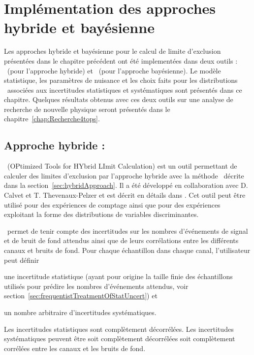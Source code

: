 \chapter{Implémentation des approches hybride et bayésienne}
\label{chap:OTHandTIFOSI}

Les approches hybride et bay\'esienne pour le calcul de limite d'exclusion pr\'esent\'ees dans le chapitre pr\'ec\'edent ont \'et\'e implement\'ees dans deux outils : \opthylic~(pour l'approche hybride) et \tifosi~(pour l'approche bay\'esienne). Le mod\`ele statistique, les param\`etres de nuisance et les choix faits pour les distributions \prior~associ\'ees aux incertitudes statistiques et syst\'ematiques sont pr\'esent\'es dans ce chapitre. Quelques r\'esultats obtenus avec ces deux outils sur une analyse de recherche de nouvelle physique seront pr\'esent\'es dans le chapitre~\ref{chap:Recherche4tops}.

\section{Approche hybride : \opthylic}
\label{sec:opthylic}

\opthylic~(OPtimized Tools for HYbrid LImit Calculation) est un outil permettant de calculer des limites d'exclusion par l'approche hybride avec la m\'ethode \CLs~d\'ecrite dans la section~\ref{sec:hybridApproach}. 
Il a \'et\'e d\'evelopp\'e en collaboration avec D. Calvet et T. Thevenaux-Pelzer et est d\'ecrit en d\'etails dans \cite{Busato:2015ola}. 
Cet outil peut \^etre utilis\'e pour des exp\'eriences de comptage ainsi que pour des exp\'eriences exploitant la forme des distributions de variables discriminantes.

\opthylic~permet de tenir compte des incertitudes sur les nombres d'\'ev\'enements de signal et de bruit de fond attendus ainsi que de leurs corr\'elations entre les diff\'erents canaux et bruits de fond. Pour chaque \'echantillon dans chaque canal, l'utilisateur peut d\'efinir
\begin{maliste}
\item une incertitude statistique (ayant pour origine la taille finie des \'echantillons utilis\'es pour pr\'edire les nombres d'\'ev\'enements attendus, voir section~\ref{sec:frequentistTreatmentOfStatUncert}) et
\item un nombre arbitraire d'incertitudes syst\'ematiques.
\end{maliste}

Les incertitudes statistiques sont compl\`etement d\'ecorr\'el\'ees. Les incertitudes syst\'ematiques peuvent \^etre soit compl\`etement d\'ecorr\'el\'ees soit compl\`etement corr\'el\'ees entre les canaux et les bruits de fond.

